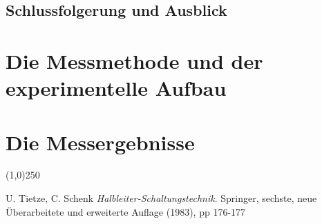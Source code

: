\documentclass[journal]{IEEEtran}
\begin{document}
\subsection{Schlussfolgerung und Ausblick }

\section{Die Messmethode und der experimentelle Aufbau}

\section{Die Messergebnisse}

\begin{center}
\line(1,0){250}
\end{center}

\begin{thebibliography}{------}
	U. Tietze, C. Schenk
	{\em Halbleiter-Schaltungstechnik}.
	Springer, sechste, neue Überarbeitete und erweiterte Auflage (1983), pp
	176-177
\end{thebibliography}
\end{document}
